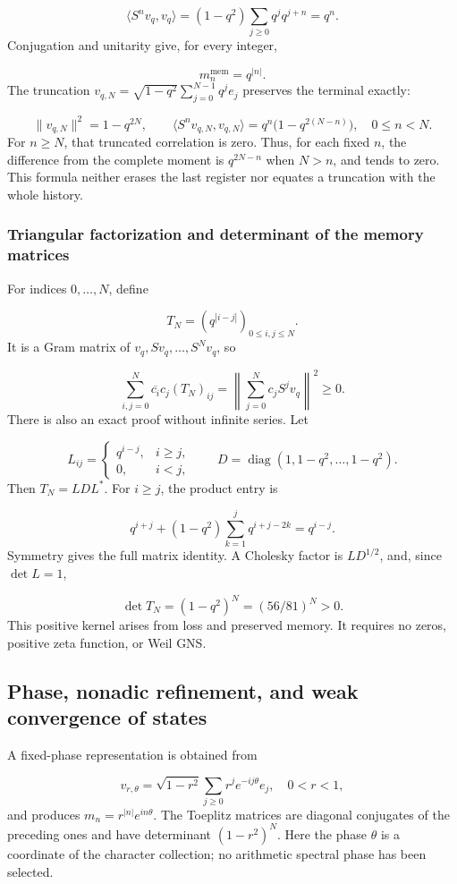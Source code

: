 \[
\langle S^n v_q,v_q\rangle
=(1-q^2)\sum_{j\ge0}q^j q^{j+n}=q^n.
\]
Conjugation and unitarity give, for every integer,

\[
\boxed{m_n^{\mathrm{mem}}=q^{|n|}.}
\]
The truncation \(v_{q,N}=\sqrt{1-q^2}\sum_{j=0}^{N-1}q^j e_j\) preserves the terminal exactly:

\[
\|v_{q,N}\|^2=1-q^{2N},\qquad
\langle S^n v_{q,N},v_{q,N}\rangle
=q^n\bigl(1-q^{2(N-n)}\bigr),\quad 0\le n<N.
\]
For \(n\ge N\), that truncated correlation is zero. Thus, for each fixed \(n\), the difference from the complete moment is \(q^{2N-n}\) when \(N>n\), and tends to zero. This formula neither erases the last register nor equates a truncation with the whole history.


\subsubsection{Triangular factorization and determinant of the memory matrices}
\label{tm-add-m2-2}
For indices \(0,\ldots,N\), define

\[
T_N=(q^{|i-j|})_{0\le i,j\le N}.
\]
It is a Gram matrix of \(v_q,Sv_q,\ldots,S^Nv_q\), so

\[
\sum_{i,j=0}^{N}\overline{c_i}c_j(T_N)_{ij}
=\left\|\sum_{j=0}^{N}c_jS^jv_q\right\|^2\ge0.
\]
There is also an exact proof without infinite series. Let

\[
L_{ij}=\begin{cases}q^{i-j},&i\ge j,\\0,&i<j,\end{cases}
\qquad D=\operatorname{diag}(1,1-q^2,\ldots,1-q^2).
\]
Then \(T_N=LDL^*\). For \(i\ge j\), the product entry is

\[
q^{i+j}+(1-q^2)\sum_{k=1}^{j}q^{i+j-2k}
=q^{i-j}.
\]
Symmetry gives the full matrix identity. A Cholesky factor is \(L D^{1/2}\), and, since \(\det L=1\),

\[
\boxed{\det T_N=(1-q^2)^N=(56/81)^N>0.}
\]
This positive kernel arises from loss and preserved memory. It requires no zeros, positive zeta function, or Weil GNS.


\subsection{Phase, nonadic refinement, and weak convergence of states}
\label{tm-add-m3}
A fixed-phase representation is obtained from

\[
v_{r,\theta}=\sqrt{1-r^2}\sum_{j\ge0}r^j e^{-ij\theta}e_j,
\quad 0<r<1,
\]
and produces \(m_n=r^{|n|}e^{in\theta}\). The Toeplitz matrices are diagonal conjugates of the preceding ones and have determinant \((1-r^2)^N\). Here the phase \(\theta\) is a coordinate of the character collection; no arithmetic spectral phase has been selected.

